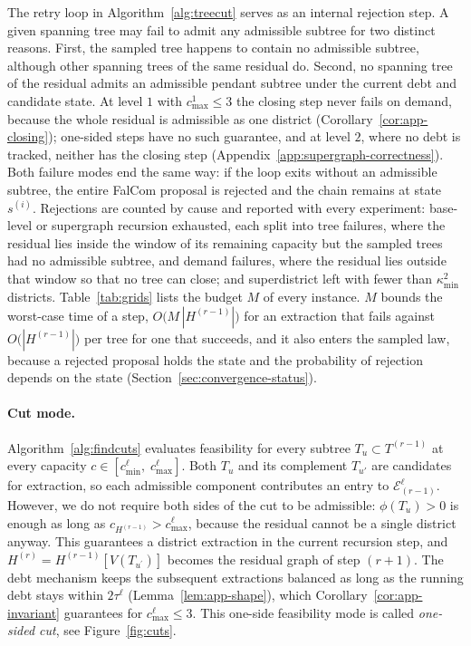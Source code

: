 \documentclass[11pt]{article}
\theoremstyle{definition}
\begin{document}
\medskip
\medskip

The retry loop in Algorithm~\ref{alg:treecut} serves as an internal rejection step. A given spanning tree may fail to admit any admissible subtree for two distinct reasons. First, the sampled tree happens to contain no admissible subtree, although other spanning trees of the same residual do. Second, no spanning tree of the residual admits an admissible pendant subtree under the current debt and candidate state. At level $1$ with $c^{1}_{\max} \leq 3$ the closing step never fails on demand, because the whole residual is admissible as one district (Corollary~\ref{cor:app-closing}); one-sided steps have no such guarantee, and at level $2$, where no debt is tracked, neither has the closing step (Appendix~\ref{app:supergraph-correctness}). Both failure modes end the same way: if the loop exits without an admissible subtree, the entire FalCom proposal is rejected and the chain remains at state $s^{(i)}$. Rejections are counted by cause and reported with every experiment: base-level or supergraph recursion exhausted, each split into tree failures, where the residual lies inside the window of its remaining capacity but the sampled trees had no admissible subtree, and demand failures, where the residual lies outside that window so that no tree can close; and superdistrict left with fewer than $\kappa^2_{\min}$ districts. Table~\ref{tab:grids} lists the budget $M$ of every instance. $M$ bounds the worst-case time of a step, $O\bigl(M\,|H^{(r-1)}|\bigr)$ for an extraction that fails against $O\bigl(|H^{(r-1)}|\bigr)$ per tree for one that succeeds, and it also enters the sampled law, because a rejected proposal holds the state and the probability of rejection depends on the state (Section~\ref{sec:convergence-status}).

\paragraph{Cut mode.} Algorithm~\ref{alg:findcuts} evaluates feasibility for every subtree $T_u \subset T^{(r-1)}$ at every capacity $c \in [c^{\ell}_{\min}, \; c^{\ell}_{\max}]$. Both $T_u$ and its complement $T_{u'}$ are candidates for extraction, so each admissible component contributes an entry to $\mathcal{E}^\ell_{(r-1)}$. However, we do not require both sides of the cut to be admissible: $\phi(T_u) > 0$ is enough as long as $c_{H^{(r-1)}} > c^{\ell}_{\max}$, because the residual cannot be a single district anyway. This guarantees a district extraction in the current recursion step, and $H^{(r)} = H^{(r-1)}[V(T_{u^{\prime}})]$ becomes the residual graph of step $(r+1)$. The debt mechanism keeps the subsequent extractions balanced as long as the running debt stays within $2\tau^{\ell}$ (Lemma~\ref{lem:app-shape}), which Corollary~\ref{cor:app-invariant} guarantees for $c^{\ell}_{\max} \leq 3$. This one-side feasibility mode is called \emph{one-sided cut}, see Figure~\hyperref[fig:4a]{\ref*{fig:cuts}}.
\end{document}

